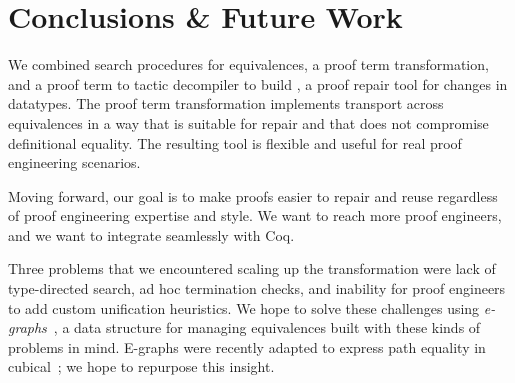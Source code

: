 \section{Conclusions \& Future Work}
\label{sec:discussion}

We combined search procedures for equivalences, a proof term transformation,
and a proof term to tactic decompiler to build \toolname,
a proof repair tool for changes in datatypes.
The proof term transformation implements transport across equivalences in a way that is suitable for repair
and that does not compromise definitional equality.
The resulting tool is flexible and useful for real proof engineering scenarios.



Moving forward, our goal is to make proofs easier to repair and reuse regardless of proof engineering expertise and style.
We want to reach more proof engineers, and we want \toolname to integrate seamlessly with Coq.

Three problems that we encountered scaling up the \toolname transformation were lack of type-directed search,
ad hoc termination checks, and inability for proof engineers to add custom unification heuristics.
We hope to solve these challenges using \textit{e-graphs}~\cite{egraph1},
a data structure %
for managing equivalences
built with these kinds of problems in mind.
E-graphs were recently adapted to express path equality in cubical~\cite{egraph6}; we hope to repurpose this insight.


